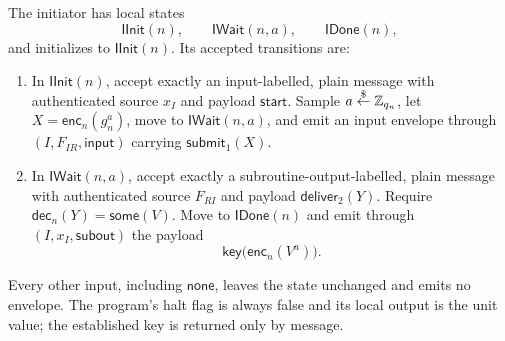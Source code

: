\begin{definition}
\label{def:dhke-initiator-program}
\notready
The initiator has local states
\[
  \mathsf{IInit}(n),
  \qquad
  \mathsf{IWait}(n,a),
  \qquad
  \mathsf{IDone}(n),
\]
and initializes to \(\mathsf{IInit}(n)\).  Its accepted transitions are:
\begin{enumerate}
\item In \(\mathsf{IInit}(n)\), accept exactly an input-labelled, plain
      message with authenticated source \(x_I\) and payload
      \(\mathsf{start}\).  Sample
      \(a\stackrel{\smash{\$}}\gets\mathbb Z_{q_n}\), let
      \(X=\mathsf{enc}_n(g_n^a)\), move to
      \(\mathsf{IWait}(n,a)\), and emit an input envelope through
      \((I,F_{IR},\mathsf{input})\) carrying
      \(\mathsf{submit}_1(X)\).
\item In \(\mathsf{IWait}(n,a)\), accept exactly a subroutine-output-labelled,
      plain message with authenticated source \(F_{RI}\) and payload
      \(\mathsf{deliver}_2(Y)\).  Require
      \(\mathsf{dec}_n(Y)=\mathsf{some}(V)\).  Move to
      \(\mathsf{IDone}(n)\) and emit through
      \((I,x_I,\mathsf{subout})\) the payload
      \[
        \mathsf{key}\bigl(\mathsf{enc}_n(V^a)\bigr).
      \]
\end{enumerate}
Every other input, including \(\mathsf{none}\), leaves the state unchanged and
emits no envelope.  The program's halt flag is always false and its local
output is the unit value; the established key is returned only by message.
\end{definition}

